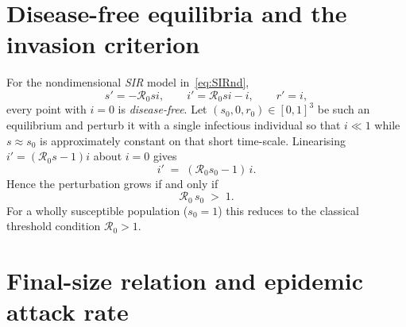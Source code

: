 \documentclass[11pt]{article}
\newcommand{\RR}{\mathcal{R}_0}
\begin{document}
\section{Disease-free equilibria and the invasion criterion}
\label{sec:DFE}

For the nondimensional \textit{SIR} model in~\cref{eq:SIRnd},
\[
s'=-\RR si,\qquad
i'=\RR si-i,\qquad
r'=i ,
\]
every point with $i=0$ is \emph{disease-free}.  Let
\((s_0,0,r_0)\in[0,1]^3\) be such an equilibrium and perturb it with a
single infectious individual so that $i\ll1$ while $s\approx s_0$ is
approximately constant on that short time-scale.  Linearising
$i'=(\RR s-1)i$ about $i=0$ gives
\begin{equation*}
  i' \;=\; (\RR s_0 - 1)\,i .
\end{equation*}
Hence the perturbation grows if and only if
\begin{equation*}
  \RR\,s_0 \;>\; 1 .
\end{equation*}
For a wholly susceptible population ($s_0=1$) this reduces to the
classical threshold condition $\RR>1$.
\section{Final-size relation and epidemic attack rate}
\label{sec:FinalSize}
\end{document}
